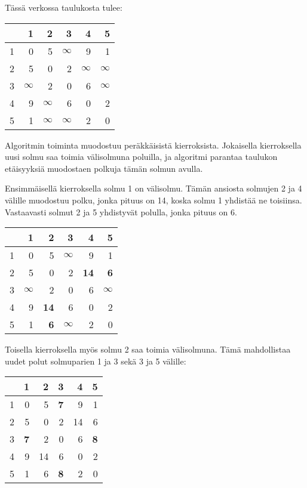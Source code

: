 Tässä verkossa taulukosta tulee:
\begin{center}
\begin{tabular}{r|rrrrr}
 & 1 & 2 & 3 & 4 & 5 \\
\hline
1 & 0 & 5 & $\infty$ & 9 & 1 \\
2 & 5 & 0 & 2 & $\infty$ & $\infty$ \\
3 & $\infty$ & 2 & 0 & 6 & $\infty$ \\
4 & 9 & $\infty$ & 6 & 0 & 2 \\
5 & 1 & $\infty$ & $\infty$ & 2 & 0 \\
\end{tabular}
\end{center}
\vspace{10pt}
Algoritmin toiminta muodostuu peräkkäisistä kierroksista.
Jokaisella kierroksella uusi solmu saa
toimia välisolmuna poluilla,
ja algoritmi parantaa taulukon
etäisyyksiä muodostaen polkuja tämän solmun avulla.

Ensimmäisellä kierroksella solmu 1 on välisolmu.
Tämän ansiosta solmujen 2 ja 4 välille muodostuu
polku, jonka pituus on 14,
koska solmu 1 yhdistää ne toisiinsa.
Vastaavasti solmut 2 ja 5 yhdistyvät polulla,
jonka pituus on 6.

\begin{center}
\begin{tabular}{r|rrrrr}
 & 1 & 2 & 3 & 4 & 5 \\
\hline
1 & 0 & 5 & $\infty$ & 9 & 1 \\
2 & 5 & 0 & 2 & \textbf{14} & \textbf{6} \\
3 & $\infty$ & 2 & 0 & 6 & $\infty$ \\
4 & 9 & \textbf{14} & 6 & 0 & 2 \\
5 & 1 & \textbf{6} & $\infty$ & 2 & 0 \\
\end{tabular}
\end{center}
\vspace{10pt}

Toisella kierroksella myös solmu 2 saa toimia välisolmuna.
Tämä mahdollistaa uudet polut solmuparien 1 ja 3
sekä 3 ja 5 välille:

\begin{center}
\begin{tabular}{r|rrrrr}
 & 1 & 2 & 3 & 4 & 5 \\
\hline
1 & 0 & 5 & \textbf{7} & 9 & 1 \\
2 & 5 & 0 & 2 & 14 & 6 \\
3 & \textbf{7} & 2 & 0 & 6 & \textbf{8} \\
4 & 9 & 14 & 6 & 0 & 2 \\
5 & 1 & 6 & \textbf{8} & 2 & 0 \\
\end{tabular}
\end{center}
\vspace{10pt}

